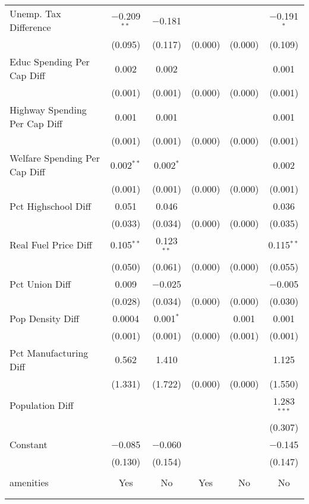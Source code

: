 \begin{table}[!htbp]
\begin{tabular}{@{\extracolsep{5pt}}lccccc}
  Unemp. Tax Difference & $-$0.209$^{**}$ & $-$0.181 &  &  & $-$0.191$^{*}$ \\ 
  & (0.095) & (0.117) & (0.000) & (0.000) & (0.109) \\ 
  Educ Spending Per Cap Diff & 0.002 & 0.002 &  &  & 0.001 \\ 
  & (0.001) & (0.001) & (0.000) & (0.000) & (0.001) \\ 
  Highway Spending Per Cap Diff & 0.001 & 0.001 &  &  & 0.001 \\ 
  & (0.001) & (0.001) & (0.000) & (0.000) & (0.001) \\ 
  Welfare Spending Per Cap Diff & 0.002$^{**}$ & 0.002$^{*}$ &  &  & 0.002 \\ 
  & (0.001) & (0.001) & (0.000) & (0.000) & (0.001) \\ 
  Pct Highschool Diff & 0.051 & 0.046 &  &  & 0.036 \\ 
  & (0.033) & (0.034) & (0.000) & (0.000) & (0.035) \\ 
  Real Fuel Price Diff & 0.105$^{**}$ & 0.123$^{**}$ &  &  & 0.115$^{**}$ \\ 
  & (0.050) & (0.061) & (0.000) & (0.000) & (0.055) \\ 
  Pct Union Diff & 0.009 & $-$0.025 &  &  & $-$0.005 \\ 
  & (0.028) & (0.034) & (0.000) & (0.000) & (0.030) \\ 
  Pop Density Diff & 0.0004 & 0.001$^{*}$ &  & 0.001 & 0.001 \\ 
  & (0.001) & (0.001) & (0.000) & (0.001) & (0.001) \\ 
  Pct Manufacturing Diff & 0.562 & 1.410 &  &  & 1.125 \\ 
  & (1.331) & (1.722) & (0.000) & (0.000) & (1.550) \\ 
  Population Diff &  &  &  &  & 1.283$^{***}$ \\ 
  &  &  &  &  & (0.307) \\ 
  Constant & $-$0.085 & $-$0.060 &  &  & $-$0.145 \\ 
  & (0.130) & (0.154) &  &  & (0.147) \\ 
 \hline \\[-1.8ex] 
amenities & Yes & No & Yes & No & No \\ 
\hline \\[-1.8ex] 
\hline 
\hline \\[-1.8ex] 
\end{tabular} 
\end{table} 
